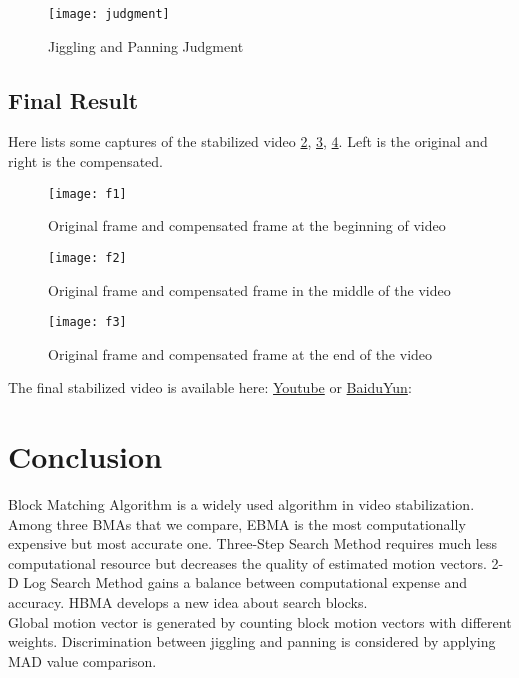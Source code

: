 \documentclass[a4paper, twocolumn]{article}
\begin{document}
	 \begin{figure}[h]
	\centering
	\texttt{[image: judgment]}
	\caption{Jiggling and Panning Judgment}
	\label{fig:judgment}
	\end{figure}
	
	\subsection{Final Result}
	Here lists some captures of the stabilized video \ref{fig:f1}, \ref{fig:f2}, \ref{fig:f3}. Left is the original and right is the compensated.
	
	\begin{figure}[h]
	\centering
	\texttt{[image: f1]}
	\caption{Original frame and compensated frame at the beginning of video}
	\label{fig:f1}
	\end{figure}
	\begin{figure}[h]
	\centering
	\texttt{[image: f2]}
	\caption{Original frame and compensated frame in the middle of the video}
	\label{fig:f2}
	\end{figure}
	\begin{figure}[h]
	\centering
	\texttt{[image: f3]}
	\caption{Original frame and compensated frame at the end of the video}
	\label{fig:f3}
	\end{figure}
	
	\noindent
	The final stabilized video is available here: \href{https://youtu.be/YMaCjQ8-WY0}{Youtube} or \href{http://pan.baidu.com/s/1bGrkvW}{BaiduYun}: 

	
	\section{Conclusion}
	Block Matching Algorithm is a widely used algorithm in video stabilization. Among three BMAs that we compare, EBMA is the most computationally expensive but most accurate one. Three-Step Search Method requires much less computational resource but decreases the quality of estimated motion vectors. 2-D Log Search Method gains a balance between computational expense and accuracy. HBMA develops a new idea about search blocks. \\
	Global motion vector is generated by counting block motion vectors with different weights. Discrimination between jiggling and panning is considered by applying MAD value comparison.
	
\end{document}
